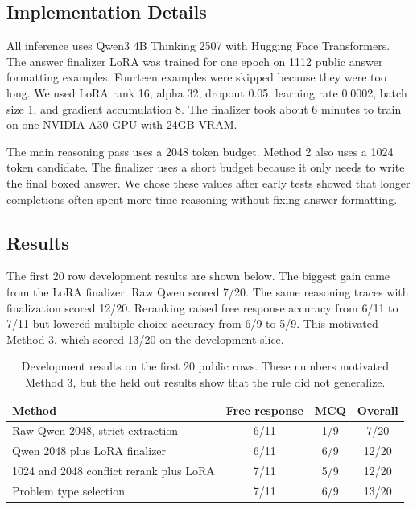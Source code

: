 \documentclass[11pt]{article}
\begin{document}
\subsection{Implementation Details}
\label{sec:implementationdetails}

All inference uses Qwen3 4B Thinking 2507 with Hugging Face Transformers. The answer finalizer LoRA was trained for one epoch on 1112 public answer formatting examples. Fourteen examples were skipped because they were too long. We used LoRA rank 16, alpha 32, dropout 0.05, learning rate 0.0002, batch size 1, and gradient accumulation 8. The finalizer took about 6 minutes to train on one NVIDIA A30 GPU with 24GB VRAM.

The main reasoning pass uses a 2048 token budget. Method 2 also uses a 1024 token candidate. The finalizer uses a short budget because it only needs to write the final boxed answer. We chose these values after early tests showed that longer completions often spent more time reasoning without fixing answer formatting.

\subsection{Results}
\label{sec:results}

The first 20 row development results are shown below. The biggest gain came from the LoRA finalizer. Raw Qwen scored 7/20. The same reasoning traces with finalization scored 12/20. Reranking raised free response accuracy from 6/11 to 7/11 but lowered multiple choice accuracy from 6/9 to 5/9. This motivated Method 3, which scored 13/20 on the development slice.

\begin{table}[H]
\caption{Development results on the first 20 public rows. These numbers motivated Method 3, but the held out results show that the rule did not generalize.}
\centering
\begin{tabular}{lccc}
\toprule
Method & Free response & MCQ & Overall \\
\midrule
Raw Qwen 2048, strict extraction & 6/11 & 1/9 & 7/20 \\
Qwen 2048 plus LoRA finalizer & 6/11 & 6/9 & 12/20 \\
1024 and 2048 conflict rerank plus LoRA & 7/11 & 5/9 & 12/20 \\
Problem type selection & 7/11 & 6/9 & 13/20 \\
\bottomrule
\end{tabular}
\end{table}
\end{document}
